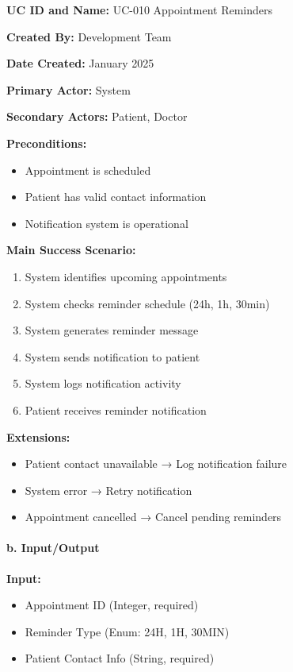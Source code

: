 \documentclass[12pt,a4paper]{article}
\begin{document}
\textbf{UC ID and Name:} UC-010 Appointment Reminders

\textbf{Created By:} Development Team

\textbf{Date Created:} January 2025

\textbf{Primary Actor:} System

\textbf{Secondary Actors:} Patient, Doctor

\textbf{Preconditions:}
\begin{itemize}
    \item Appointment is scheduled
    \item Patient has valid contact information
    \item Notification system is operational
\end{itemize}

\textbf{Main Success Scenario:}
\begin{enumerate}
    \item System identifies upcoming appointments
    \item System checks reminder schedule (24h, 1h, 30min)
    \item System generates reminder message
    \item System sends notification to patient
    \item System logs notification activity
    \item Patient receives reminder notification
\end{enumerate}

\textbf{Extensions:}
\begin{itemize}
    \item Patient contact unavailable → Log notification failure
    \item System error → Retry notification
    \item Appointment cancelled → Cancel pending reminders
\end{itemize}

\paragraph{b. Input/Output}

\textbf{Input:}
\begin{itemize}
    \item Appointment ID (Integer, required)
    \item Reminder Type (Enum: 24H, 1H, 30MIN)
    \item Patient Contact Info (String, required)
\end{itemize}
\end{document}
